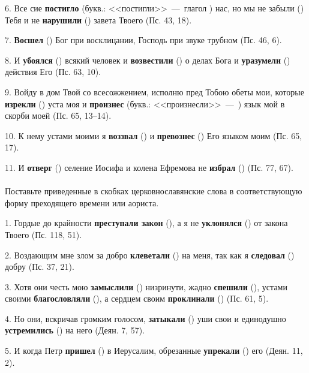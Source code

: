 \documentclass[11pt,a4paper,oneside]{memoir}
\newcommand{\exercise}{}
\begin{document}
    6. Все сие \textbf{постигло} (букв.: <<постигли>>~---~глагол {}) нас, но мы не забыли ({}) Тебя и не \textbf{нарушили} ({}) завета Твоего (Пс. 43, 18).
    
    7. \textbf{Восшел} ({}) Бог при восклицании, Господь при звуке трубном (Пс. 46, 6).
    
    8. И \textbf{убоялся} ({}) всякий человек и \textbf{возвестили} ({}) о делах Бога и \textbf{уразумели} ({}) действия Его (Пс. 63, 10).
    
    9. Войду в дом Твой со всесожжением, исполню пред Тобою обеты мои, которые \textbf{изрекли} ({}) уста моя и \textbf{произнес} (букв.: <<произнесли>>~---~{}) язык мой в скорби моей (Пс. 65, 13--14).
    
    10. К нему устами моими я \textbf{воззвал} ({}) и \textbf{превознес} ({}) Его языком моим (Пс. 65, 17).
    
    11. И \textbf{отверг} ({}) селение Иосифа и колена Ефремова не \textbf{избрал} ({}) (Пс. 77, 67).
    
                    \paragraph{\exercise}
                    
    Поставьте приведенные в скобках церковнославянские слова в соответствующую форму преходящего времени или аориста.
    
    1. Гордые до крайности \textbf{преступали закон} ({}), а я не \textbf{уклонялся} ({}) от закона Твоего (Пс. 118, 51).
    
    2. Воздающим мне злом за добро \textbf{клеветали} ({}) на меня, так как я \textbf{следовал} ({}) добру (Пс. 37, 21).
    
    3. Хотя они честь мою \textbf{замыслили} ({}) низринути, жадно \textbf{спешили} ({}), устами своими \textbf{благословляли} ({}), а сердцем своим \textbf{проклинали} ({}) (Пс. 61, 5).
    
    4. Но они, вскричав громким голосом, \textbf{затыкали} ({}) уши свои и единодушно \textbf{устремились} ({}) на него (Деян. 7, 57).
    
    5. И когда Петр \textbf{пришел} ({}) в Иерусалим, обрезанные \textbf{упрекали} ({}) его (Деян. 11, 2).
    
\end{document}
